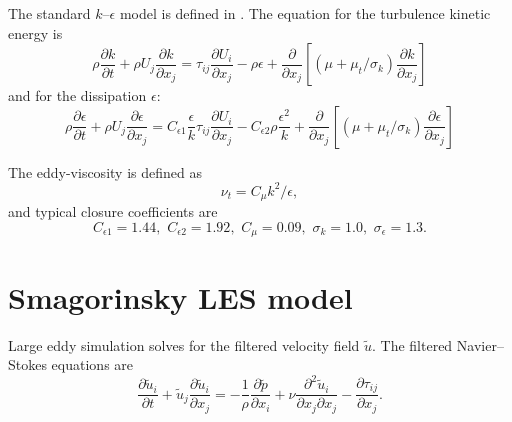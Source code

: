 The standard $k$--$\epsilon$ model is defined in \cite{Wilcox1994}. The equation
for the turbulence kinetic energy is
\begin{equation}
    \rho \frac{\partial k}{\partial t}
    + \rho U_j \frac{\partial k}{\partial x_j}
    = \tau_{ij} \frac{\partial U_i}{\partial x_j}
    - \rho \epsilon
    + \frac{\partial}{\partial x_j}
    \left[
    (\mu + \mu_t/\sigma_k) \frac{\partial k}{\partial x_j}
    \right]
    \label{eq:kepsilon-k}
\end{equation}
and for the dissipation $\epsilon$:
\begin{equation}
    \rho \frac{\partial \epsilon}{\partial t}
    + \rho U_j \frac{\partial \epsilon}{\partial x_j}
    = C_{\epsilon 1} \frac{\epsilon}{k} \tau_{ij}
    \frac{\partial U_i}{\partial x_j}
    - C_{\epsilon 2} \rho \frac{\epsilon^2}{k}
    + \frac{\partial}{\partial x_j}
    \left[
    (\mu + \mu_t/\sigma_k) \frac{\partial \epsilon}{\partial x_j}
    \right]
    \label{eq:kepsilon-epsilon}
\end{equation}

The eddy-viscosity is defined as
\begin{equation}
    \nu_t = C_\mu k^2 / \epsilon,
    \label{eq:kepsilon-nut}
\end{equation}
and typical closure coefficients are
\begin{equation}
    C_{\epsilon 1} = 1.44, \, \,
    C_{\epsilon 2} = 1.92, \, \,
    C_\mu = 0.09, \, \,
    \sigma_k = 1.0, \, \,
    \sigma_\epsilon = 1.3.
\end{equation}


\section{Smagorinsky LES model}

Large eddy simulation solves for the filtered velocity field $\tilde{u}$. The
filtered Navier--Stokes equations are
\begin{equation}
    \frac{\partial \tilde{u}_i}{\partial t}
    + \tilde{u}_j \frac{\partial \tilde{u}_i}{\partial x_j}
    = - \frac{1}{\rho} \frac{\partial \tilde{p}}{\partial x_i}
    + \nu \frac{\partial^2 \tilde{u}_i}{\partial x_j \partial x_j}
    - \frac{\partial \tau_{ij}}{\partial x_j}.
    \label{eq:filtered-ns}
\end{equation}

